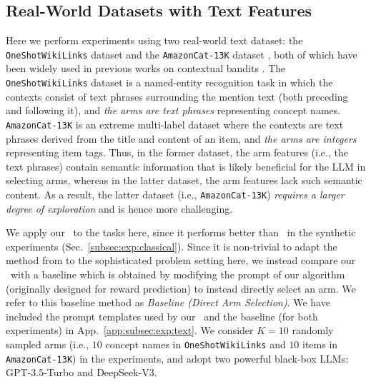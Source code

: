 \subsection{Real-World Datasets with Text Features}
\label{subsec:exp:text}
Here we perform experiments using two real-world text dataset: the \texttt{OneShotWikiLinks} dataset \cite{singh2012wikilinks,oneshotwikilink} and the \texttt{AmazonCat-13K} dataset \cite{Bhatia16}, both of which have been widely used in previous works on contextual bandits \cite{chen2024efficient}.
The \texttt{OneShotWikiLinks} dataset \cite{singh2012wikilinks,oneshotwikilink} is a named-entity recognition task in which the contexts consist of text phrases surrounding the mention text (both preceding and following it), and \emph{the arms are text phrases} representing concept names. \texttt{AmazonCat-13K} \cite{Bhatia16} is an extreme multi-label dataset where the contexts are text phrases derived from the title and content of an item, and \emph{the arms are integers} representing item tags.
Thus, in the former dataset, the arm features (i.e., the text phrases) contain semantic information that is likely beneficial for the LLM in selecting arms, whereas in the latter dataset, the arm features lack such semantic content. As a result, the latter dataset (i.e., \texttt{AmazonCat-13K}) \emph{requires a larger degree of exploration} and is hence more challenging.

We apply our \algts~to the tasks here, since it performs better than \algro~in the synthetic experiments (Sec.~\ref{subsec:exp:classical}).
Since it is non-trivial to adapt the method from \citet{krishnamurthy2024can} to the sophisticated problem setting here, we instead compare our \algts~with a baseline which is obtained by modifying the prompt of our algorithm (originally designed for reward prediction) to instead directly select an arm. We refer to this baseline method as \emph{Baseline (Direct Arm Selection)}.
We have included the prompt templates used by our \algts~and the baseline (for both experiments) in App.~\ref{app:subsec:exp:text}.
We consider $K=10$ randomly sampled arms (i.e., $10$ concept names in \texttt{OneShotWikiLinks} and $10$ items in \texttt{AmazonCat-13K}) in the experiments, and adopt two powerful black-box LLMs: GPT-3.5-Turbo and DeepSeek-V3.

